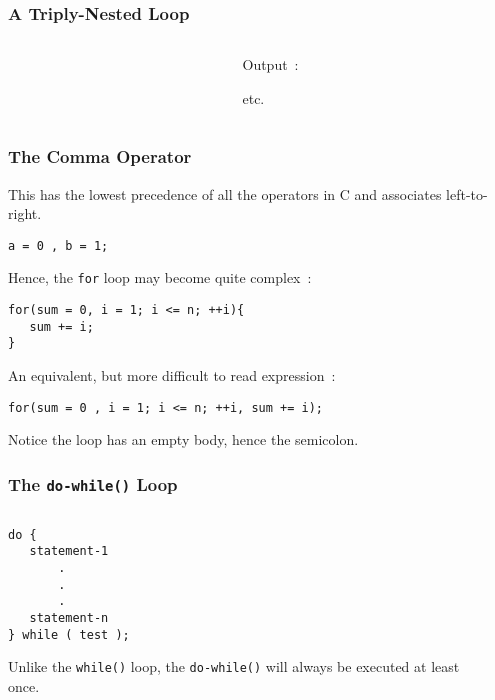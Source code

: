 \begin{frame}[fragile]
\frametitle{A Triply-Nested Loop}

\begin{columns}
\begin{column}{0.55\textwidth}

\end{column}

\begin{column}{0.40\textwidth}
{\scriptsize Output~:}

{\scriptsize etc.}

\end{column}

\end{columns}
\end{frame}

\begin{frame}[fragile]
\frametitle{The Comma Operator}

This has the lowest precedence of all the operators in C
and associates left-to-right.

\begin{lstlisting}[style=basicc,numbers=none]
a = 0 , b = 1;
\end{lstlisting}

Hence, the {\tt for} loop may become quite complex~:

\begin{lstlisting}[style=basicc,numbers=none]
for(sum = 0, i = 1; i <= n; ++i){
   sum += i;
}
\end{lstlisting}

An equivalent, but more difficult to read expression~:
\begin{lstlisting}[style=basicc,numbers=none]
for(sum = 0 , i = 1; i <= n; ++i, sum += i);
\end{lstlisting}

Notice the loop has an empty body, hence the semicolon.
\end{frame}

\begin{frame}[fragile]
\frametitle{The {\tt do-while()} Loop}

\begin{columns}
\begin{column}{0.35\textwidth}
\begin{lstlisting}[style=basicc,numbers=none]
do {
   statement-1
       .
       .
       .
   statement-n
} while ( test );
\end{lstlisting}

Unlike the \verb^while()^ loop, the \verb^do-while()^ will always
be executed at least once.
\end{column}

\pause
\begin{column}{0.60\textwidth}

\end{column}

\end{columns}
\end{frame}

